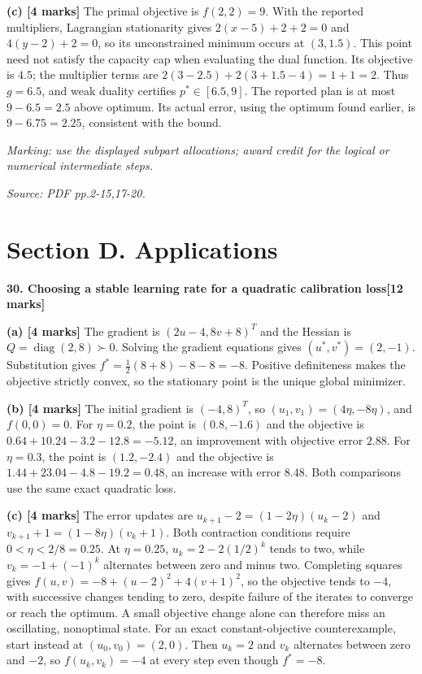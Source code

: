 \documentclass[11pt,a4paper]{article}
\begin{document}
\textbf{(c) [4 marks]} The primal objective is \(f(2,2)=9\). With the reported multipliers, Lagrangian stationarity gives \(2(x-5)+2+2=0\) and \(4(y-2)+2=0\), so its unconstrained minimum occurs at \((3,1.5)\). This point need not satisfy the capacity cap when evaluating the dual function. Its objective is \(4.5\); the multiplier terms are \(2(3-2.5)+2(3+1.5-4)=1+1=2\). Thus \(g=6.5\), and weak duality certifies \(p^*\in[6.5,9]\). The reported plan is at most \(9-6.5=2.5\) above optimum. Its actual error, using the optimum found earlier, is \(9-6.75=2.25\), consistent with the bound.

\textit{Marking: use the displayed subpart allocations; award credit for the logical or numerical intermediate steps.}\par
{\footnotesize\textit{Source: PDF pp.2-15,17-20.}}
\newpage\section*{Section D. Applications}
\textbf{30. Choosing a stable learning rate for a quadratic calibration loss}\hfill\textbf{[12 marks]}\par\medskip
\textbf{(a) [4 marks]} The gradient is \((2u-4,8v+8)^T\) and the Hessian is \(Q=\operatorname{diag}(2,8)\succ0\). Solving the gradient equations gives \((u^*,v^*)=(2,-1)\). Substitution gives \(f^*=\tfrac12(8+8)-8-8=-8\). Positive definiteness makes the objective strictly convex, so the stationary point is the unique global minimizer.

\textbf{(b) [4 marks]} The initial gradient is \((-4,8)^T\), so \((u_1,v_1)=(4\eta,-8\eta)\), and \(f(0,0)=0\). For \(\eta=0.2\), the point is \((0.8,-1.6)\) and the objective is \(0.64+10.24-3.2-12.8=-5.12\), an improvement with objective error \(2.88\). For \(\eta=0.3\), the point is \((1.2,-2.4)\) and the objective is \(1.44+23.04-4.8-19.2=0.48\), an increase with error \(8.48\). Both comparisons use the same exact quadratic loss.

\textbf{(c) [4 marks]} The error updates are \(u_{k+1}-2=(1-2\eta)(u_k-2)\) and \(v_{k+1}+1=(1-8\eta)(v_k+1)\). Both contraction conditions require \(0<\eta<2/8=0.25\). At \(\eta=0.25\), \(u_k=2-2(1/2)^k\) tends to two, while \(v_k=-1+(-1)^k\) alternates between zero and minus two. Completing squares gives \(f(u,v)=-8+(u-2)^2+4(v+1)^2\), so the objective tends to \(-4\), with successive changes tending to zero, despite failure of the iterates to converge or reach the optimum. A small objective change alone can therefore miss an oscillating, nonoptimal state. For an exact constant-objective counterexample, start instead at \((u_0,v_0)=(2,0)\). Then \(u_k=2\) and \(v_k\) alternates between zero and \(-2\), so \(f(u_k,v_k)=-4\) at every step even though \(f^*=-8\).
\end{document}
